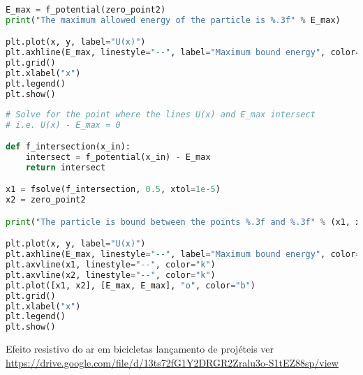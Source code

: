 \begin{lstlisting}[language=Python, frame=lines,basicstyle=\footnotesize, caption={Energia Máxima de uma partícula presa pelo potencial. Dados disponíveis no arquivo Potential.txt},label={lst:Potential3}]
E_max = f_potential(zero_point2)
print("The maximum allowed energy of the particle is %.3f" % E_max)

plt.plot(x, y, label="U(x)")
plt.axhline(E_max, linestyle="--", label="Maximum bound energy", color="k")
plt.grid()
plt.xlabel("x")
plt.legend()
plt.show()
\end{lstlisting}

\begin{lstlisting}[language=Python, frame=lines,basicstyle=\footnotesize, caption={Região permitida para a partícula presa pelo potencial. Dados disponíveis no arquivo Potential.txt},label={lst:Potential4}]
# Solve for the point where the lines U(x) and E_max intersect
# i.e. U(x) - E_max = 0

def f_intersection(x_in):
    intersect = f_potential(x_in) - E_max
    return intersect

x1 = fsolve(f_intersection, 0.5, xtol=1e-5)
x2 = zero_point2

print("The particle is bound between the points %.3f and %.3f" % (x1, x2))

plt.plot(x, y, label="U(x)")
plt.axhline(E_max, linestyle="--", label="Maximum bound energy", color="k")
plt.axvline(x1, linestyle="--", color="k")
plt.axvline(x2, linestyle="--", color="k")
plt.plot([x1, x2], [E_max, E_max], "o", color="b")
plt.grid()
plt.xlabel("x")
plt.legend()
plt.show()
\end{lstlisting}

Efeito resistivo do ar em bicicletas
lançamento de projéteis
ver  \href{URL}{https://drive.google.com/file/d/13ts72fG1Y2DRGR2Zralu3o-S1tEZ88sp/view}

